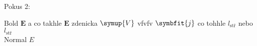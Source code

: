 \documentclass[
  fontsize=12pt,
  open=any,
  titlepage=false,
  chapterprefix=true]{scrbook}
\newcommand*{\bm}[1]{\symbf{#1}}
\begin{document}
%
Pokus 2:

Bold $\bm{E}$ a co takhle \(\symbf{E}\) zdenicka \(\symup{V}\) vfvfv
\(\symbfit{j}\) co tohhle \(l_{\text{stř}}\) nebo  \(l_\text{stř}\)
\\
Normal $E$


%
\end{document}
